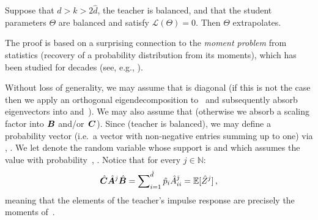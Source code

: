 \begin{lemma}\label{lemma:exact_extrapolation}
Suppose that $d > k > 2\hat{d}$, the teacher is balanced, and that the student parameters $\Theta$ are balanced and satisfy $\mathcal{L} ( \Theta ) = 0$. Then $\Theta$ extrapolates.
\end{lemma}
\begin{sproof}
The proof is based on a surprising connection to the \textit{moment problem} from statistics (recovery of a probability distribution from its moments), which has been studied for decades (see, e.g., \cite{schmudgen2017moment}). 

Without loss of generality, we may assume that \smash{$\hat{\mA}$} is diagonal (if this is not the case then we apply an orthogonal eigendecomposition to~\smash{$\hat{\mA}$} and subsequently absorb eigenvectors into \smash{$\hat{\mB}$} and~\smash{$\hat{\mC}$}).
We may also assume that  (otherwise we absorb a scaling factor into ${\bm{B}}$ and/or~${\bm{C}}$).
Since \smash{$\hat{\mC}^\top=\hat{\mB}$} (teacher is balanced), we may define a probability vector (i.e.~a vector with non-negative entries summing up to one)  via , .
We let  denote the random variable whose support is  and which assumes the value  with probability~, .
Notice that for every $j \in \mathbb{N}$:
\[
\hat{{\bm{C}}} \hat{{\bm{A}}}^j \hat{{\bm{B}}} = \sum\nolimits_{i=1}^{\hat{d}} \hat{p}_i \hat{{A}}_{i i} ^j = \mathbb{E}[\hat{Z}^j]
\text{\,,}
\]
meaning that the elements of the teacher's impulse response are precisely the moments of~.


\end{sproof}
